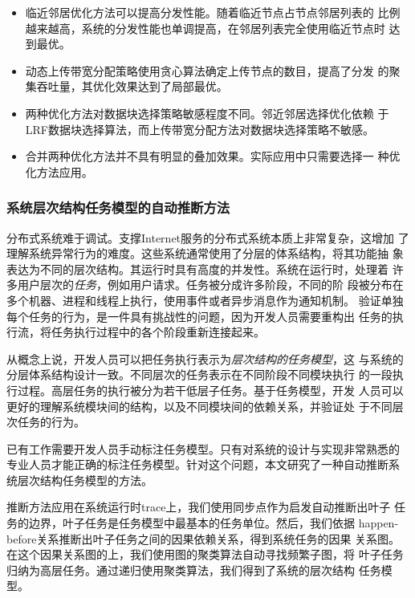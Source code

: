 \begin{itemize}

  \item 临近邻居优化方法可以提高分发性能。随着临近节点占节点邻居列表的
  比例越来越高，系统的分发性能也单调提高，在邻居列表完全使用临近节点时
  达到最优。

  \item 动态上传带宽分配策略使用贪心算法确定上传节点的数目，提高了分发
  的聚集吞吐量，其优化效果达到了局部最优。
  
  \item 两种优化方法对数据块选择策略敏感程度不同。邻近邻居选择优化依赖
  于LRF数据块选择算法，而上传带宽分配方法对数据块选择策略不敏感。

  \item 合并两种优化方法并不具有明显的叠加效果。实际应用中只需要选择一
  种优化方法应用。

\end{itemize}


\subsubsection*{系统层次结构任务模型的自动推断方法}

分布式系统难于调试。支撑Internet服务的分布式系统本质上非常复杂，这增加
了理解系统异常行为的难度。这些系统通常使用了分层的体系结构，将其功能抽
象表达为不同的层次结构。其运行时具有高度的并发性。系统在运行时，处理着
许多用户层次的\emph{任务}，例如用户请求。任务被分成许多阶段，不同的阶
段被分布在多个机器、进程和线程上执行，使用事件或者异步消息作为通知机制。
验证单独每个任务的行为，是一件具有挑战性的问题，因为开发人员需要重构出
任务的执行流，将任务执行过程中的各个阶段重新连接起来。

从概念上说，开发人员可以把任务执行表示为\emph{层次结构的任务模型}，这
与系统的分层体系结构设计一致。不同层次的任务表示在不同阶段不同模块执行
的一段执行过程。高层任务的执行被分为若干低层子任务。基于任务模型，开发
人员可以更好的理解系统模块间的结构，以及不同模块间的依赖关系，并验证处
于不同层次任务的行为。

已有工作需要开发人员手动标注任务模型。只有对系统的设计与实现非常熟悉的
专业人员才能正确的标注任务模型。针对这个问题，本文研究了一种自动推断系
统层次结构任务模型的方法。

推断方法应用在系统运行时trace上，我们使用同步点作为启发自动推断出叶子
任务的边界，叶子任务是任务模型中最基本的任务单位。然后，我们依据
happen-before关系推断出叶子任务之间的因果依赖关系，得到系统任务的因果
关系图。在这个因果关系图的上，我们使用图的聚类算法自动寻找频繁子图，将
叶子任务归纳为高层任务。通过递归使用聚类算法，我们得到了系统的层次结构
任务模型。

